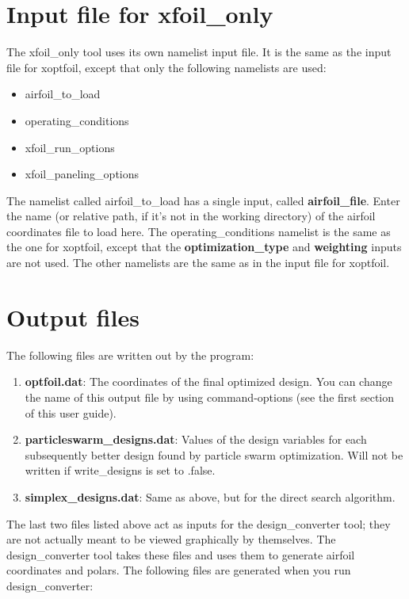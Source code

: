 \documentclass[11pt]{article}
\begin{document}
\section{Input file for xfoil\_only}

The xfoil\_only tool uses its own namelist input file.  It is the same as the input file
for xoptfoil, except that only the following namelists are used:

\begin{itemize}
\item{airfoil\_to\_load}
\item{operating\_conditions}
\item{xfoil\_run\_options}
\item{xfoil\_paneling\_options}
\end{itemize}

The namelist called airfoil\_to\_load has a single input, called \textbf{airfoil\_file}.
Enter the name (or relative path, if it's not in the working directory) of the airfoil 
coordinates file to load here.  The operating\_conditions namelist is the same as the one
for xoptfoil, except that the \textbf{optimization\_type} and \textbf{weighting} inputs
are not used. The other namelists are the same as in the input file for xoptfoil.

\section{Output files}

The following files are written out by the program:

\begin{enumerate}
\item{\textbf{optfoil.dat}: The coordinates of the final optimized design. You can change
the name of this output file by using command-options (see the first section of this user
guide).}
\item{\textbf{particleswarm\_designs.dat}: Values of the design variables for each 
subsequently better design found by particle swarm optimization.  Will not be written if
write\_designs is set to .false.}
\item{\textbf{simplex\_designs.dat}: Same as above, but for the direct search algorithm.}
\end{enumerate}

The last two files listed above act as inputs for the design\_converter tool; they are not
actually meant to be viewed graphically by themselves.  The design\_converter tool takes
these files and uses them to generate airfoil coordinates and polars.  The following files
are generated when you run design\_converter:
\end{document}
